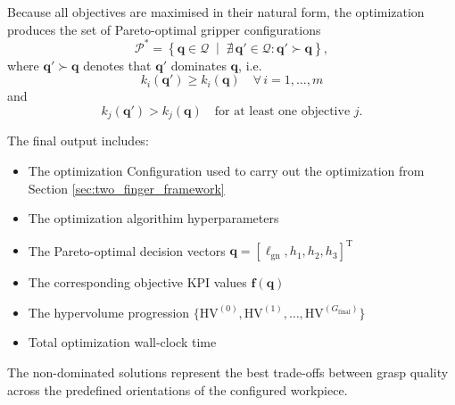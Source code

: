 Because all objectives are maximised in their natural form, the optimization produces the set of
Pareto-optimal gripper configurations
\begin{equation}
    \mathcal{P}^{*}
    =
    \left\{
        \mathbf{q}\in\mathcal{Q}
        \;\middle|\;
        \nexists\,\mathbf{q}'\in\mathcal{Q}:
        \mathbf{q}' \succ \mathbf{q}
    \right\},
\end{equation}
where $\mathbf{q}'\succ\mathbf{q}$ denotes that $\mathbf{q}'$ dominates $\mathbf{q}$, i.e.
\begin{equation}
    k_i(\mathbf{q}')\geq k_i(\mathbf{q})
    \quad
    \forall\, i = 1,\ldots,m
\end{equation}
and
\begin{equation}
    k_j(\mathbf{q}')>k_j(\mathbf{q})
    \quad
    \text{for at least one objective } j .
\end{equation}

The final output includes:
\begin{itemize}
    \item The optimization Configuration used to carry out the optimization from Section \ref{sec:two_finger_framework}
    \item The optimization algorithim hyperparameters 
    \item The Pareto-optimal decision vectors
          $\mathbf{q}=[\ell_{\mathrm{gn}},h_1,h_2,h_3]^{\mathrm{T}}$
    \item The corresponding objective KPI values $\mathbf{f}(\mathbf{q})$
    \item The hypervolume progression
          $\{\mathrm{HV}^{(0)},\mathrm{HV}^{(1)},\ldots,\mathrm{HV}^{(G_{\mathrm{final}})}\}$
    \item Total optimization wall-clock time
\end{itemize}

The non-dominated solutions represent the best trade-offs between grasp quality across the
predefined orientations of the configured workpiece.